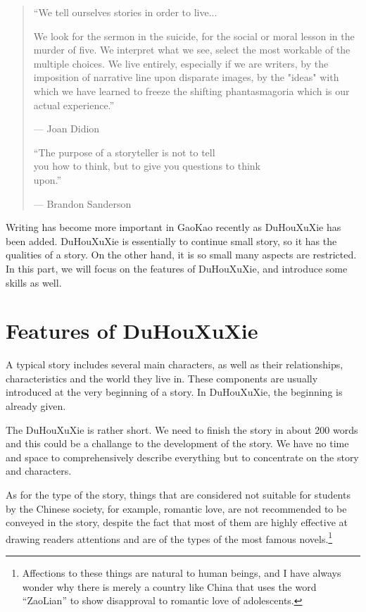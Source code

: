 \begin{quotation}
{\ttfamily ``We tell ourselves stories in order to live...

\begin{sloppypar}
We look for the sermon in the suicide, for the social or moral lesson in the 
murder of five. We interpret what we see, select the most workable of the 
multiple choices. We live entirely, especially if we are writers, by the 
imposition of narrative line upon disparate images, by the "ideas" with which we 
have learned to freeze the shifting phantasmagoria which is our actual 
experience.''
\end{sloppypar}
--- Joan Didion\cite{TellStoriesToLive}

``The purpose of a storyteller is not to tell \\
you how to think, but to give you 
questions to think \\
upon.''

--- Brandon Sanderson}
\end{quotation}

\newcommand{\GK}{GaoKao}
\newcommand{\DHXX}{DuHouXuXie}
\newcommand{\TriActStruct}{Three-act structure}

Writing has become more important in GaoKao recently as \DHXX{} has been added.
\DHXX{} is essentially to continue small story, so it has the qualities of a 
story. On the other hand, it is so small many aspects are restricted. In this 
part, 
we will focus on the features of \DHXX , and introduce some skills as well.

\section{Features of \DHXX}
A typical story includes several main characters, as well as their relationships,
characteristics and the world they live in. These components are usually 
introduced at the very beginning of a story. In \DHXX , the beginning is already 
given.

The \DHXX{} is rather short. We need to finish the story in about 200 words and 
this could be a challange to the development of the story. We have no time and 
space to comprehensively describe everything but to concentrate on the story and 
characters. 

As for the type of the story, things that are considered not suitable for 
students by the Chinese society, for example, romantic love, are not recommended 
to be conveyed in the story, despite the fact that most of them are highly 
effective at drawing readers attentions and are of the types of the most famous 
novels.\footnote{Affections to these things are natural to human beings, and I 
have always wonder why there is merely a country like China that uses the word 
``ZaoLian'' to show disapproval to romantic love of adolescents.}

